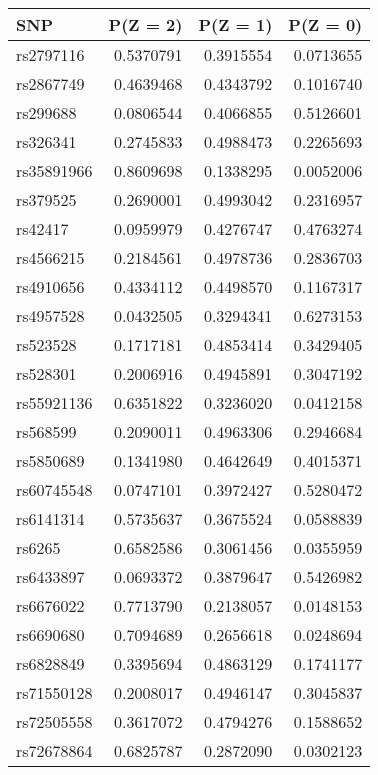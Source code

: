 \documentclass[
]{article}
\theoremstyle{plain}
\begin{document}
\begin{table}[H]
\begin{minipage}{0.5\linewidth}
  \end{minipage}
  \qquad
  \begin{minipage}{0.5\linewidth}
    \center
    \begin{table}[H]
\centering
\begin{tabular}{lrrr}
\toprule
SNP & P(Z = 2) & P(Z = 1) & P(Z = 0)\\
\midrule
rs2797116 & 0.5370791 & 0.3915554 & 0.0713655\\
rs2867749 & 0.4639468 & 0.4343792 & 0.1016740\\
rs299688 & 0.0806544 & 0.4066855 & 0.5126601\\
rs326341 & 0.2745833 & 0.4988473 & 0.2265693\\
rs35891966 & 0.8609698 & 0.1338295 & 0.0052006\\
\addlinespace
rs379525 & 0.2690001 & 0.4993042 & 0.2316957\\
rs42417 & 0.0959979 & 0.4276747 & 0.4763274\\
rs4566215 & 0.2184561 & 0.4978736 & 0.2836703\\
rs4910656 & 0.4334112 & 0.4498570 & 0.1167317\\
rs4957528 & 0.0432505 & 0.3294341 & 0.6273153\\
\addlinespace
rs523528 & 0.1717181 & 0.4853414 & 0.3429405\\
rs528301 & 0.2006916 & 0.4945891 & 0.3047192\\
rs55921136 & 0.6351822 & 0.3236020 & 0.0412158\\
rs568599 & 0.2090011 & 0.4963306 & 0.2946684\\
rs5850689 & 0.1341980 & 0.4642649 & 0.4015371\\
\addlinespace
rs60745548 & 0.0747101 & 0.3972427 & 0.5280472\\
rs6141314 & 0.5735637 & 0.3675524 & 0.0588839\\
rs6265 & 0.6582586 & 0.3061456 & 0.0355959\\
rs6433897 & 0.0693372 & 0.3879647 & 0.5426982\\
rs6676022 & 0.7713790 & 0.2138057 & 0.0148153\\
\addlinespace
rs6690680 & 0.7094689 & 0.2656618 & 0.0248694\\
rs6828849 & 0.3395694 & 0.4863129 & 0.1741177\\
rs71550128 & 0.2008017 & 0.4946147 & 0.3045837\\
rs72505558 & 0.3617072 & 0.4794276 & 0.1588652\\
rs72678864 & 0.6825787 & 0.2872090 & 0.0302123\\

\end{tabular}
\end{table}
\end{minipage}
\end{table}
\end{document}
